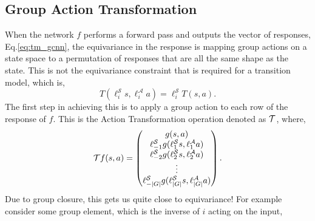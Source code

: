 \subsection{Group Action Transformation}
When the network $f$ performs a forward pass and outputs the vector of responses, Eq.\ref{eq:tm_gcnn}, the equivariance in the response is mapping group actions on a state space to a permutation of responses that are all the same shape as the state. This is not the equivariance constraint that is required for a transition model, which is,
\begin{equation}
	T(\ell_i^\mathcal{S}s, \ell_i^\mathcal{A}a) = \ell_i^\mathcal{S}T(s, a).
\end{equation}
The first step in achieving this is to apply a group action to each row of the response of $f$. This is the Action Transformation operation denoted as $\mathbf{\mathcal{T}}$, where,
\begin{equation}
	\mathbf{\mathcal{T}}f(s,a) = \begin{pmatrix}
		g(s, a)                                                          \\
		\ell_{-1}^\mathcal{S}g(\ell_1^\mathcal{S}s,\ell^\mathcal{A}_1a)  \\
		\ell_{-2}^\mathcal{S}g(\ell^\mathcal{S}_2s, \ell^\mathcal{A}_2a) \\
		\vdots                                                           \\
		\ell_{-|G|}^\mathcal{S}g(\ell_{|G|}^\mathcal{S}s, \ell^\mathcal{A}_{|G|}a)
	\end{pmatrix}.
\end{equation}
Due to group closure, this gets us quite close to equivariance! For example consider some group element, which is the inverse of $i$ acting on the input,

